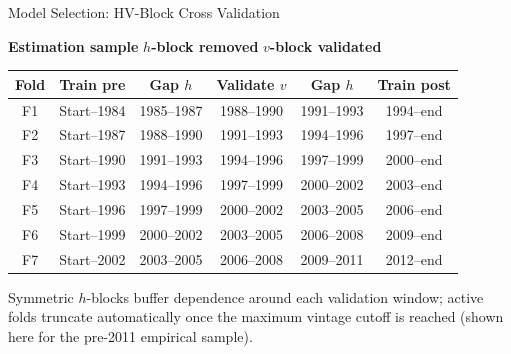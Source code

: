 \documentclass[aspectratio=169,11pt]{beamer}
\begin{document}
\begin{frame}[t]{Model Selection: HV-Block Cross Validation}
	\centering
	
	\footnotesize
	\textcolor{blue!55!black}{\textbf{Estimation sample}}
	\hspace{1.2em}
	\textcolor{orange!80!black}{\textbf{$h$-block removed}}
	\hspace{1.2em}
	\textcolor{green!45!black}{\textbf{$v$-block validated}}
	
	\vspace{0.55em}
	
	{\small
	\setlength{\tabcolsep}{4.5pt}
	\renewcommand{\arraystretch}{1.12}
	\begin{tabular}{@{}clcccc@{}}
		\toprule
		\textbf{Fold} &
		\textbf{\textcolor{blue!55!black}{Train pre}} &
		\textbf{\textcolor{orange!80!black}{Gap $h$}} &
		\textbf{\textcolor{green!45!black}{Validate $v$}} &
		\textbf{\textcolor{orange!80!black}{Gap $h$}} &
		\textbf{\textcolor{blue!55!black}{Train post}} \\
		\midrule
		F1 & Start--1984 & 1985--1987 & 1988--1990 & 1991--1993 & 1994--end \\
		F2 & Start--1987 & 1988--1990 & 1991--1993 & 1994--1996 & 1997--end \\
		F3 & Start--1990 & 1991--1993 & 1994--1996 & 1997--1999 & 2000--end \\
		F4 & Start--1993 & 1994--1996 & 1997--1999 & 2000--2002 & 2003--end \\
		F5 & Start--1996 & 1997--1999 & 2000--2002 & 2003--2005 & 2006--end \\
		F6 & Start--1999 & 2000--2002 & 2003--2005 & 2006--2008 & 2009--end \\
		F7 & Start--2002 & 2003--2005 & 2006--2008 & 2009--2011 & 2012--end \\
		\bottomrule
	\end{tabular}}
	
	\vspace{0.35em}
	
	\raggedright
	\scriptsize Symmetric $h$-blocks buffer dependence around each validation window; active folds truncate automatically once the maximum vintage cutoff is reached (shown here for the pre-2011 empirical sample).
\end{frame}
\end{document}
